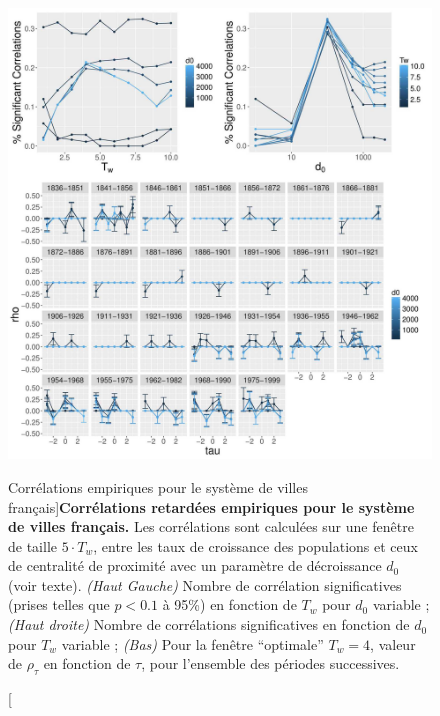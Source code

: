 


\begin{figure}
	\includegraphics[width=\linewidth]{Figures/Final/6-2-3-fig-macrocoevol-empirical.jpg}
	\caption[Empirical Lagged Correlations for French City System][Corrélations empiriques pour le système de villes français]{\label{fig:macrocoevol:empirical}}{\textbf{Corrélations retardées empiriques pour le système de villes français.} Les corrélations sont calculées sur une fenêtre de taille $5\cdot T_w$, entre les taux de croissance des populations et ceux de centralité de proximité avec un paramètre de décroissance $d_0$ (voir texte). \textit{(Haut Gauche)} Nombre de corrélation significatives (prises telles que $p<0.1$ à 95\%) en fonction de $T_w$ pour $d_0$ variable ; \textit{(Haut droite)} Nombre de corrélations significatives en fonction de $d_0$ pour $T_w$ variable ; \textit{(Bas)} Pour la fenêtre ``optimale'' $T_w=4$, valeur de $\rho_{\tau}$ en fonction de $\tau$, pour l'ensemble des périodes successives.\label{fig:macrocoevol:empirical}}
\end{figure}









